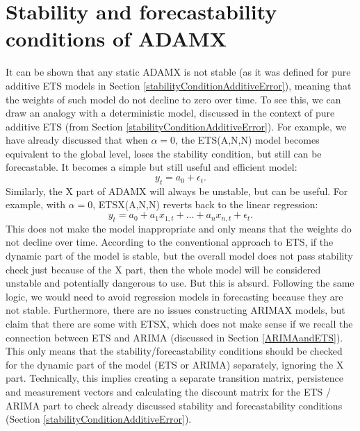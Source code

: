 \documentclass[]{book}
\theoremstyle{definition}
\theoremstyle{definition}
\theoremstyle{definition}
\theoremstyle{definition}
\theoremstyle{remark}
\begin{document}
\hypertarget{stability-and-forecastability-conditions-of-adamx}{%
\section{Stability and forecastability conditions of ADAMX}\label{stability-and-forecastability-conditions-of-adamx}}

It can be shown that any static ADAMX is not stable (as it was defined for pure additive ETS models in Section \ref{stabilityConditionAdditiveError}), meaning that the weights of such model do not decline to zero over time. To see this, we can draw an analogy with a deterministic model, discussed in the context of pure additive ETS (from Section \ref{stabilityConditionAdditiveError}). For example, we have already discussed that when \(\alpha=0\), the ETS(A,N,N) model becomes equivalent to the global level, loses the stability condition, but still can be forecastable. It becomes a simple but still useful and efficient model:
\begin{equation}
  y_{t} = a_0 + \epsilon_t .
  \label{eq:ADAMETSGlobalLevelSimple}
\end{equation}
Similarly, the X part of ADAMX will always be unstable, but can be useful. For example, with \(\alpha=0\), ETSX(A,N,N) reverts back to the linear regression:
\begin{equation}
  y_{t} = a_0 + a_{1} x_{1,t} + \dots + a_n x_{n,t} + \epsilon_t .
  \label{eq:ADAMETSXRegression}
\end{equation}
This does not make the model inappropriate and only means that the weights do not decline over time. According to the conventional approach to ETS, if the dynamic part of the model is stable, but the overall model does not pass stability check just because of the X part, then the whole model will be considered unstable and potentially dangerous to use. But this is absurd. Following the same logic, we would need to avoid regression models in forecasting because they are not stable. Furthermore, there are no issues constructing ARIMAX models, but \citet{Hyndman2008b} claim that there are some with ETSX, which does not make sense if we recall the connection between ETS and ARIMA (discussed in Section \ref{ARIMAandETS}). This only means that the stability/forecastability conditions should be checked for the dynamic part of the model (ETS or ARIMA) separately, ignoring the X part. Technically, this implies creating a separate transition matrix, persistence and measurement vectors and calculating the discount matrix for the ETS / ARIMA part to check already discussed stability and forecastability conditions (Section \ref{stabilityConditionAdditiveError}).
\end{document}
